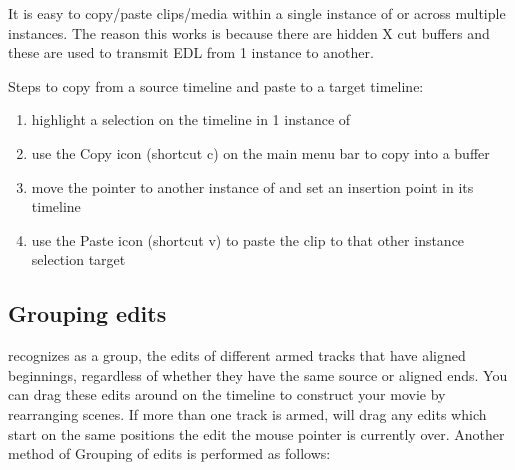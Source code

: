 It is easy to copy/paste clips/media within a single instance of
\CGG{} or across multiple instances.  The reason this works is
because there are hidden X cut buffers and these are used to
transmit EDL from 1 instance to another.

Steps to copy from a source timeline and paste to a target timeline:

\begin{enumerate}
	\item highlight a selection on the timeline in 1 instance of \CGG{}
	\item use the Copy icon (shortcut c) on the main menu bar to copy
	into a buffer
	\item move the pointer to another instance of \CGG{} and set an
	insertion point in its timeline
	\item use the Paste icon (shortcut v) to paste the clip to that
	other instance selection target
\end{enumerate}

\subsection{Grouping edits}%
\label{sub:grouping_edits}

\CGG{} recognizes as a group, the edits of different armed tracks
that have aligned beginnings, regardless of whether they have the
same source or aligned ends.  You can drag these edits around on the
timeline to construct your movie by rearranging scenes. If more than
one track is armed, \CGG{} will drag any edits which start on the
same positions the edit the mouse pointer is currently over. Another
method of Grouping of edits is performed as follows:

